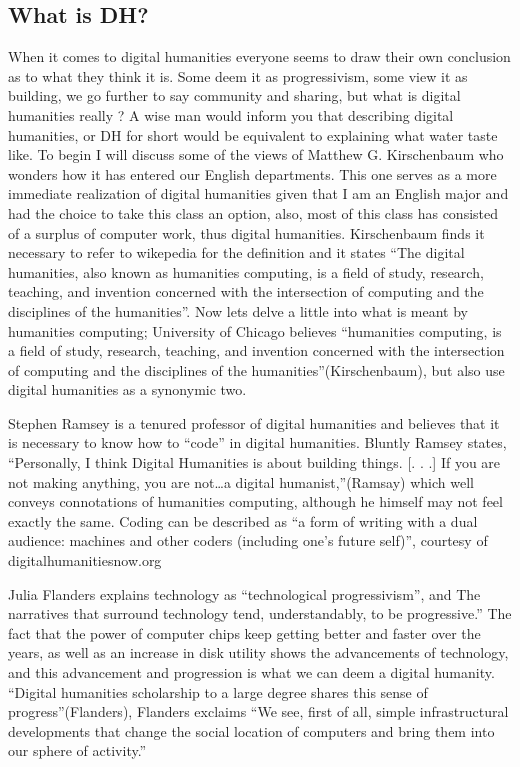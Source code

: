 \documentclass[]{article}
\begin{document}
\subsection{What is DH?}\label{what-is-dh-1}

When it comes to digital humanities everyone seems to draw their own
conclusion as to what they think it is. Some deem it as progressivism,
some view it as building, we go further to say community and sharing,
but what is digital humanities really ? A wise man would inform you that
describing digital humanities, or DH for short would be equivalent to
explaining what water taste like. To begin I will discuss some of the
views of Matthew G. Kirschenbaum who wonders how it has entered our
English departments. This one serves as a more immediate realization of
digital humanities given that I am an English major and had the choice
to take this class an option, also, most of this class has consisted of
a surplus of computer work, thus digital humanities. Kirschenbaum finds
it necessary to refer to wikepedia for the definition and it states
``The digital humanities, also known as humanities computing, is a field
of study, research, teaching, and invention concerned with the
intersection of computing and the disciplines of the humanities''. Now
lets delve a little into what is meant by humanities computing;
University of Chicago believes ``humanities computing, is a field of
study, research, teaching, and invention concerned with the intersection
of computing and the disciplines of the humanities''(Kirschenbaum), but
also use digital humanities as a synonymic two.

Stephen Ramsey is a tenured professor of digital humanities and believes
that it is necessary to know how to ``code'' in digital humanities.
Bluntly Ramsey states, ``Personally, I think Digital Humanities is about
building things. {[}. . .{]} If you are not making anything, you are
not\ldots{}a digital humanist,''(Ramsay) which well conveys connotations
of humanities computing, although he himself may not feel exactly the
same. Coding can be described as ``a form of writing with a dual
audience: machines and other coders (including one's future self)'',
courtesy of digitalhumanitiesnow.org

Julia Flanders explains technology as ``technological progressivism'',
and The narratives that surround technology tend, understandably, to be
progressive.'' The fact that the power of computer chips keep getting
better and faster over the years, as well as an increase in disk utility
shows the advancements of technology, and this advancement and
progression is what we can deem a digital humanity. ``Digital humanities
scholarship to a large degree shares this sense of progress''(Flanders),
Flanders exclaims ``We see, first of all, simple infrastructural
developments that change the social location of computers and bring them
into our sphere of activity.''
\end{document}
